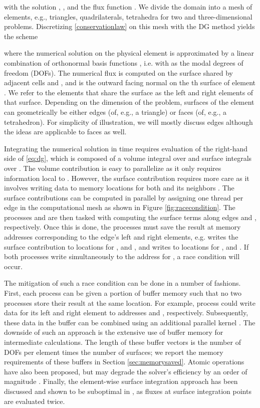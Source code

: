 \documentclass[12pt]{article}
\begin{document}
with the solution , , and the flux function .  We divide the domain  into a mesh of elements, e.g., triangles, quadrilaterals, tetrahedra for two and three-dimensional problems.  Discretizing \eqref{conservationlaw} on this mesh with the DG method \cite{giuliani} yields the scheme 

where the numerical solution  on the physical element  is approximated by a linear combination of  orthonormal basis functions , i.e.  with  as the modal degrees of freedom (DOFs). The numerical flux  is computed on the surface shared by adjacent cells  and , and  is the outward facing normal on the th surface of element .  We refer to the elements that share the surface  as the left and right elements of that surface.  Depending on the dimension of the problem, surfaces of the element  can geometrically be either edges (of, e.g., a triangle) or faces (of, e.g., a tetrahedron).  For simplicity of illustration, we will mostly discuss edges although the ideas are applicable to faces as well.  

Integrating the numerical solution in time requires evaluation of the right-hand side of \eqref{eq:dg}, which is composed of a volume integral over  and surface integrals over .  The volume contribution is easy to parallelize as it only requires information local to .  However, the surface contribution requires more care as it involves writing data to memory locations for both  and its neighbors . The surface contributions can be computed in parallel by assigning one thread per edge in the computational mesh as shown in Figure \ref{fig:racecondition}.  The processes  and  are then tasked with computing the surface terms along edges  and , respectively.  Once this is done, the processes must save the result at memory addresses corresponding to the edge's left and right elements, e.g.  writes the surface contribution to locations for , and , and  writes to locations for , and . If both processes write simultaneously to the address for , a race condition will occur.

The mitigation of such a race condition can be done in a number of fashions.  First, each process can be given a portion of buffer memory such that no two processes store their result at the same location.  For example, process  could write data for its left and right element to addresses  and , respectively.  Subsequently, these data in the buffer can be combined using an additional parallel kernel \cite{giuliani, nodaldg, corrigan}. The downside of such an approach is the extensive use of buffer memory for intermediate calculations.  The length of these buffer vectors is the number of DOFs per element times the number of surfaces; we report the memory requirements of these buffers in Section \ref{sec:memorysaved}.  Atomic operations have also been proposed, but may degrade the solver's efficiency by an order of magnitude \cite{giuliani}.  Finally, the element-wise surface integration approach has been discussed and shown to be suboptimal in \cite{giuliani,luo2, corrigan}, as fluxes at surface integration points are evaluated twice.
\end{document}
